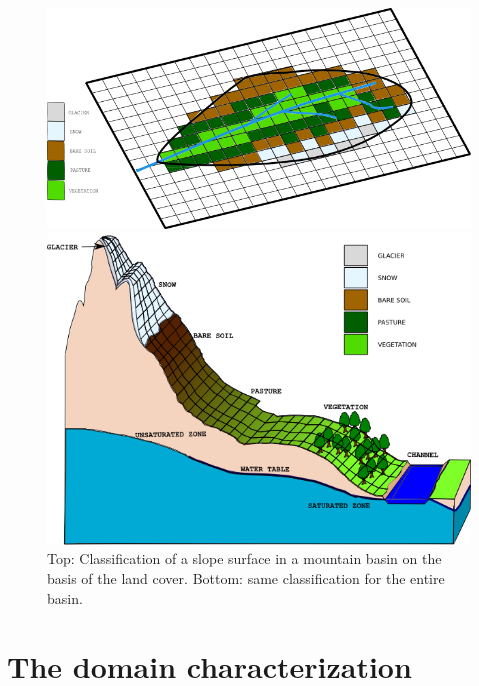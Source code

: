 \newpage
\begin{figure}[tbp]
\begin{center}
\begin{minipage}[c]{0.35 \textheight}
\centering
\includegraphics[width=1.4 \textwidth]{./images/pic_domain/land_cover_foglia}
\end{minipage}
\vspace{10 mm}
\begin{minipage}[c]{0.5 \textheight}
\centering
\includegraphics[width=0.9 \textwidth]{./images/pic_domain/general2D}
\end{minipage}
\caption{Top: Classification of a slope surface in a mountain basin on the basis of the land cover. Bottom: same classification for the entire basin.}
\label{Fig_general}
\end{center}
\end{figure}

\section{The domain characterization}

